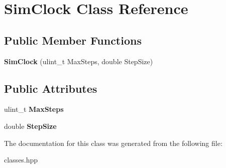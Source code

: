 \hypertarget{classSimClock}{}\section{Sim\+Clock Class Reference}
\label{classSimClock}
\subsection*{Public Member Functions}
\begin{DoxyCompactItemize}
\item 
\mbox{\label{classSimClock_a48d55945181d601412781d7339517f42}} 
{\bfseries Sim\+Clock} (ulint\+\_\+t Max\+Steps, double Step\+Size)
\end{DoxyCompactItemize}
\subsection*{Public Attributes}
\begin{DoxyCompactItemize}
\item 
\mbox{\label{classSimClock_ade33fe8377af11b75e62bc8209ba1612}} 
ulint\+\_\+t {\bfseries Max\+Steps}
\item 
\mbox{\label{classSimClock_af0358bc2bcd48824345b11e1c20c7671}} 
double {\bfseries Step\+Size}
\end{DoxyCompactItemize}


The documentation for this class was generated from the following file\+:\begin{DoxyCompactItemize}
\item 
classes.\+hpp\end{DoxyCompactItemize}
